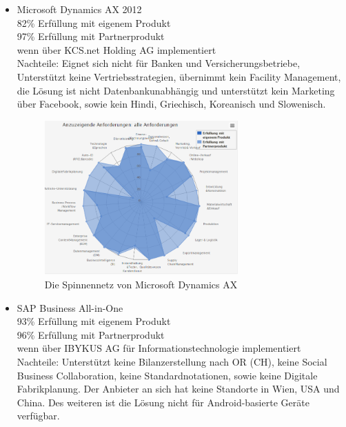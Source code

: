 \documentclass[12pt]{article}
\begin{document}
\begin{itemize}
\item Microsoft Dynamics AX 2012 \\
		82\% Erfüllung mit eigenem Produkt\\
		97\% Erfüllung mit Partnerprodukt\\
		wenn über KCS.net Holding AG implementiert\\
		Nachteile: Eignet sich nicht für Banken und Versicherungsbetriebe, Unterstützt keine Vertriebsstrategien, übernimmt kein Facility Management, die Lösung ist nicht Datenbankunabhängig und unterstützt kein Marketing über Facebook, sowie kein Hindi, Griechisch, Koreanisch und Slowenisch.
		
\begin{figure}[here!]
\centering
\includegraphics[width=0.7\textwidth]{images/matching2}
\caption{Die Spinnennetz von  Microsoft Dynamics AX }
\end{figure}\FloatBarrier
\noindent
\item SAP Business All-in-One\\
		93\% Erfüllung mit eigenem Produkt\\
		96\% Erfüllung mit Partnerprodukt\\		
		wenn über IBYKUS AG für Informationstechnologie implementiert\\
		Nachteile: Unterstützt keine Bilanzerstellung nach OR (CH), keine Social Business Collaboration, keine Standardnotationen, sowie keine Digitale Fabrikplanung. Der Anbieter an sich hat keine Standorte in Wien, USA und China. Des weiteren ist die Lösung nicht für Android-basierte Geräte verfügbar.
		


\end{itemize}
\end{document}
